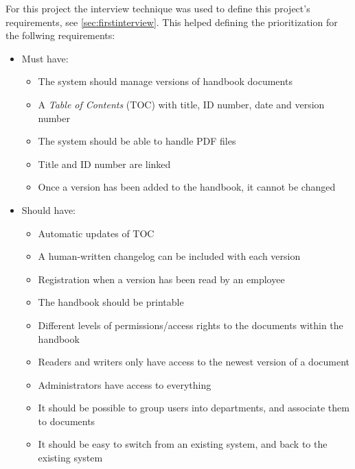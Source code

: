 For this project the interview technique was used to define this project's requirements, see \cref{sec:firstinterview}. This helped defining the prioritization for the follwing requirements:

\begin{itemize}
    \item Must have:
        \begin{itemize}
            \item The system should manage versions of handbook documents
            \item A \textit{Table of Contents} (TOC) with title, ID number, date and version number
            \item The system should be able to handle PDF files
            \item Title and ID number are linked
            \item Once a version has been added to the handbook, it cannot be changed
        \end{itemize}
    \item Should have:
        \begin{itemize}
			\item Automatic updates of TOC
            \item A human-written changelog can be included with each version
            \item Registration when a version has been read by an employee
            \item The handbook should be printable
            \item Different levels of permissions/access rights to the documents within the handbook
            \item Readers and writers only have access to the newest version of a document
            \item Administrators have access to everything
            \item It should be possible to group users into departments, and associate them to documents
            \item It should be easy to switch from an existing system, and back to the existing system


\end{itemize}
\end{itemize}
